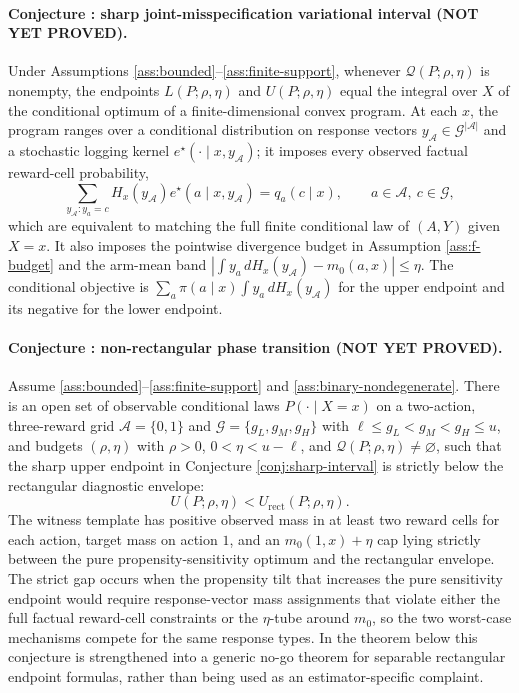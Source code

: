 \documentclass[11pt]{article}
\theoremstyle{definition}
\theoremstyle{plain}
\theoremstyle{remark}
\begin{document}
\paragraph{Conjecture \thestagezeroconjecture: sharp joint-misspecification variational interval (NOT YET PROVED).}
Under Assumptions \ref{ass:bounded}--\ref{ass:finite-support}, whenever $\mathcal Q(P;\rho,\eta)$ is nonempty, the endpoints $L(P;\rho,\eta)$ and $U(P;\rho,\eta)$ equal the integral over $X$ of the conditional optimum of a finite-dimensional convex program. At each $x$, the program ranges over a conditional distribution on response vectors $y_{\mathcal A}\in\mathcal G^{|\mathcal A|}$ and a stochastic logging kernel $e^\star(\cdot\mid x,y_{\mathcal A})$; it imposes every observed factual reward-cell probability,
\[
  \sum_{y_{\mathcal A}:y_a=c}
    H_x(y_{\mathcal A})e^\star(a\mid x,y_{\mathcal A})
  =q_a(c\mid x),
  \qquad a\in\mathcal A,\ c\in\mathcal G,
\]
which are equivalent to matching the full finite conditional law of $(A,Y)$ given $X=x$. It also imposes the pointwise divergence budget in Assumption \ref{ass:f-budget} and the arm-mean band
$|\int y_a\,dH_x(y_{\mathcal A})-m_0(a,x)|\le\eta$. The conditional objective is
$\sum_a\pi(a\mid x)\int y_a\,dH_x(y_{\mathcal A})$ for the upper endpoint and its negative for the lower endpoint.

\label{conj:nonrect}
\paragraph{Conjecture \thestagezeroconjecture: non-rectangular phase transition (NOT YET PROVED).}
Assume \ref{ass:bounded}--\ref{ass:finite-support} and \ref{ass:binary-nondegenerate}. There is an open set of observable conditional laws $P(\cdot\mid X=x)$ on a two-action, three-reward grid $\mathcal A=\{0,1\}$ and $\mathcal G=\{g_L,g_M,g_H\}$ with $\ell\le g_L<g_M<g_H\le u$, and budgets $(\rho,\eta)$ with $\rho>0$, $0<\eta<u-\ell$, and $\mathcal Q(P;\rho,\eta)\ne\varnothing$, such that the sharp upper endpoint in Conjecture \ref{conj:sharp-interval} is strictly below the rectangular diagnostic envelope:
\[
  U(P;\rho,\eta) < U_{\mathrm{rect}}(P;\rho,\eta).
\]
The witness template has positive observed mass in at least two reward cells for each action, target mass on action $1$, and an $m_0(1,x)+\eta$ cap lying strictly between the pure propensity-sensitivity optimum and the rectangular envelope. The strict gap occurs when the propensity tilt that increases the pure sensitivity endpoint would require response-vector mass assignments that violate either the full factual reward-cell constraints or the $\eta$-tube around $m_0$, so the two worst-case mechanisms compete for the same response types. In the theorem below this conjecture is strengthened into a generic no-go theorem for separable rectangular endpoint formulas, rather than being used as an estimator-specific complaint.
\end{document}
